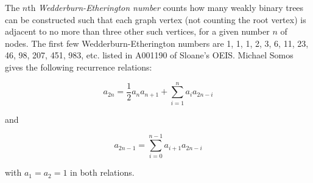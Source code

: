 \documentclass[12pt]{article}
\begin{document}
The $n$th {\em Wedderburn-Etherington number} counts how many weakly binary trees can be constructed such that each graph vertex (not counting the root vertex) is adjacent to no more than three other such vertices, for a given number $n$ of nodes. The first few Wedderburn-Etherington numbers are 1, 1, 1, 2, 3, 6, 11, 23, 46, 98, 207, 451, 983, etc. listed in A001190 of Sloane's  OEIS. Michael Somos gives the following recurrence relations:

$$a_{2n} = \frac{1}{2} a_n a_{n + 1} + \sum_{i = 1}^n a_i a_{2n - i}$$

and

$$a_{2n - 1} = \sum_{i = 0}^{n - 1} a_{i + 1} a_{2n - i}$$

with $a_1 = a_2 = 1$ in both relations.
\end{document}
